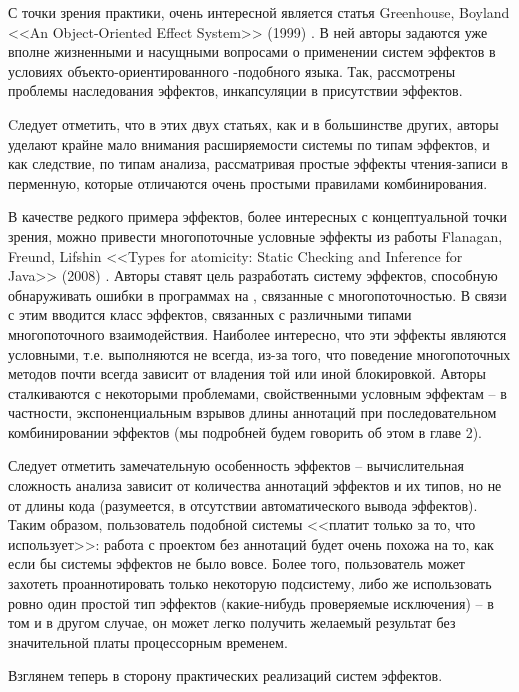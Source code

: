 С точки зрения практики, очень интересной является статья Greenhouse, Boyland <<An Object-Oriented Effect System>> (1999) \cite{Green99}. В ней авторы задаются уже вполне жизненными и насущными вопросами о применении систем эффектов в условиях объекто-ориентированного -подобного языка. Так, рассмотрены проблемы наследования эффектов, инкапсуляции в присутствии эффектов.

Cледует отметить, что в этих двух статьях, как и в большинстве других, авторы уделают крайне мало внимания расширяемости системы по типам эффектов, и как следствие, по типам анализа, рассматривая простые  эффекты чтения-записи в перменную, которые отличаются очень простыми правилами комбинирования.

В качестве редкого примера эффектов, более интересных с концептуальной точки зрения, можно привести многопоточные условные эффекты из работы Flanagan, Freund, Lifshin <<Types for atomicity: Static Checking and Inference for Java>> (2008) \cite{Flanagan08}. Авторы ставят цель разработать систему эффектов, способную обнаруживать ошибки в программах на , связанные с многопоточностью. В связи с этим вводится класс эффектов, связанных с различными типами многопоточного взаимодействия. Наиболее интересно, что эти эффекты являются условными, т.е. выполняются не всегда, из-за того, что поведение многопоточных методов почти всегда зависит от владения той или иной блокировкой. Авторы сталкиваются с некоторыми проблемами, свойственными условным эффектам -- в частности, экспоненциальным взрывов длины аннотаций при последовательном комбинировании эффектов (мы подробней будем говорить об этом в главе 2).

Следует отметить замечательную особенность эффектов -- вычислительная сложность анализа зависит от количества аннотаций эффектов и их типов, но не от длины кода (разумеется, в отсутствии автоматического вывода эффектов). Таким образом, пользователь подобной системы <<платит только за то, что использует>>: работа с проектом без аннотаций будет очень похожа на то, как если бы системы эффектов не было вовсе. Более того, пользователь может захотеть проаннотировать только некоторую подсистему, либо же использовать ровно один простой тип эффектов (какие-нибудь проверяемые исключения) -- в том и в другом случае, он может легко получить желаемый результат без значительной платы процессорным временем.


\bigskip

Взглянем теперь в сторону практических реализаций систем эффектов.

